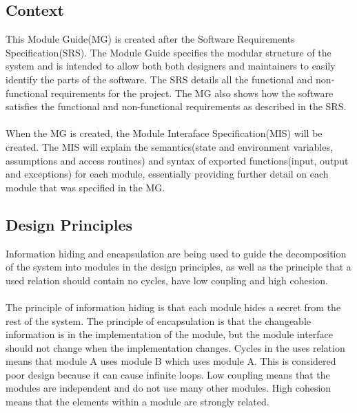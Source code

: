 \documentclass[12pt, titlepage]{article}
\begin{document}
\subsection{Context}
This Module Guide(MG) is created after the Software Requirements Specification(SRS). The Module Guide specifies the modular structure of the system and is intended to allow both both designers and maintainers to easily identify the parts of the software. The SRS details all the functional and non-functional requirements for the project. The MG also shows how the software satisfies the functional and non-functional requirements as described in the SRS.
\\\\
When the MG is created, the Module Interaface Specification(MIS) will be created. The MIS will explain the semantics(state and environment variables, assumptions and access routines) and syntax of exported functions(input, output and exceptions) for each module, essentially providing further detail on each module that was specified in the MG.
\subsection{Design Principles}
Information hiding and encapsulation are being used to guide the decomposition of the system into modules in the design principles, as well as the principle that a used relation should contain no cycles, have low coupling and high cohesion.\\\\
The principle of information hiding is that each module hides a secret from the rest of the system. The principle of encapsulation is that the changeable information is in the implementation of the module, but the module interface should not change when the implementation changes. Cycles in the uses relation means that module A uses module B which uses module A. This is considered poor design because it can cause infinite loops. Low coupling means that the modules are independent and do not use many other modules. High cohesion means that the elements within a module are strongly related.
\end{document}
